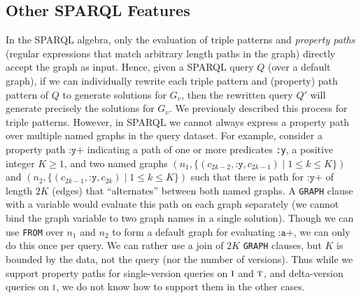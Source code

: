 \documentclass[a4paper]{llncs}
\makeatletter
\renewcommand\paragraph{\@startsection{paragraph}{4}{\z@}%
	{1ex \@plus1ex \@minus.2ex}%
	{-1em}%
	{\normalfont\normalsize\itshape}}
\newcommand{\ssyn}[3]{[\ensuremath{#1\,\textsc{#2}\,#3}]}
\newcommand{\suni}[2]{\ssyn{#1}{union}{#2}}
\newcommand{\sminus}[2]{\ssyn{#1}{minus}{#2}}
\newcommand{\sfrom}[3]{\ensuremath{\textsc{from}_{#2,#3}#1}}
\makeatother
\begin{document}
\subsection{Other SPARQL Features} 

In the SPARQL algebra, only the evaluation of triple patterns and \textit{property paths} (regular expressions that match arbitrary length paths in the graph) directly accept the graph as input. Hence, given a SPARQL query $Q$ (over a default graph), if we can individually rewrite each triple pattern and (property) path pattern of $Q$ to generate solutions for $G_v$, then the rewritten query $Q'$ will generate precisely the solutions for $G_v$. We previously described this process for triple patterns. However, in SPARQL we cannot always express a property path over multiple named graphs in the query dataset. For example, consider a property path $\texttt{:y+}$ indicating a path of one or more predicates \texttt{:y}, a positive integer $K \geq 1$, and two named graphs $(n_1,\{(c_{2k-2},\texttt{:y},c_{2k-1}) \mid 1 \leq k \leq K \})$ and $(n_2,\{(c_{2k-1},\texttt{:y},c_{2k}) \mid 1 \leq k \leq K \})$ such that there is path for $\texttt{:y+}$ of length $2K$ (edges) that ``alternates'' between both named graphs. A \texttt{GRAPH} clause with a variable would evaluate this path on each graph separately (we cannot bind the graph variable to two graph names in a single solution). Though we can use \texttt{FROM} over $n_1$ and $n_2$ to form a default graph for evaluating $\texttt{:a+}$, we can only do this once per query. We can rather use a join of $2K$ \texttt{GRAPH} clauses, but $K$ is bounded by the data, not the query (nor the number of versions). Thus while we support property paths for single-version queries on $\textsc{i}$ and $\textsc{t}$, and delta-version queries on $\textsc{i}$, we do not know how to support them in the other cases.


%
\end{document}
